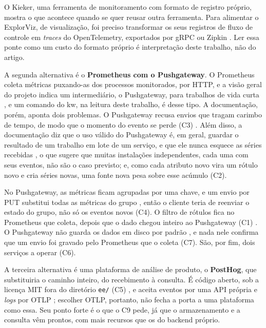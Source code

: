 O Kieker, uma
ferramenta de monitoramento com formato de registro próprio, mostra o que
acontece quando se quer reusar outra ferramenta. Para alimentar o ExplorViz,
de visualização, foi preciso transformar os seus registros de fluxo de
controle em \textit{traces} do OpenTelemetry, exportados por gRPC ou Zipkin
\citep{reichelt2024kieker}. Ler essa ponte como um custo do formato próprio é
interpretação deste trabalho, não do artigo.

A segunda alternativa é o \textbf{Prometheus com o Pushgateway}. O Prometheus
coleta métricas puxando-as dos processos monitorados, por HTTP, e a visão
geral do projeto indica um intermediário, o Pushgateway, para trabalhos de
vida curta \citep{prometheus_overview}, e um comando do kw, na leitura deste
trabalho, é desse tipo. A documentação, porém, aponta dois problemas. O
Pushgateway recusa envios que tragam carimbo de tempo, de modo que o momento
do evento se perde (C3) \citep{pushgateway_readme}. Além disso, a documentação
diz que o uso válido do Pushgateway é, em geral, guardar o resultado de um
trabalho em lote de um serviço, e que ele nunca esquece as séries recebidas
\citep{prometheus_pushing}, o que sugere que muitas instalações independentes,
cada uma com seus eventos, não são o caso previsto; e, como cada atributo novo
vira um rótulo novo e cria séries novas, uma fonte nova pesa sobre esse
acúmulo (C2).

No Pushgateway, as métricas ficam agrupadas por uma chave, e um envio por PUT
substitui todas as métricas do grupo \citep{pushgateway_readme}, então o
cliente teria de reenviar o estado do grupo, não só os eventos novos (C4). O
filtro de rótulos fica no Prometheus que coleta, depois que o dado chegou
inteiro ao Pushgateway (C1) \citep{prometheus_config_v3_16_0}. O Pushgateway
não guarda os dados em disco por padrão \citep{pushgateway_readme}, e nada
nele confirma que um envio foi gravado pelo Prometheus que o coleta (C7). São,
por fim, dois serviços a operar (C6).

A terceira alternativa é uma plataforma de análise de produto, o
\textbf{PostHog}, que substituiria o caminho inteiro, do recebimento à
consulta. É código aberto, sob a licença MIT fora do diretório \texttt{ee/}
(C5) \citep{posthog_license}, e aceita eventos por uma API própria e
\textit{logs} por OTLP \citep{posthog_capture, posthog_logs}; escolher OTLP,
portanto, não fecha a porta a uma plataforma como essa. Seu ponto forte é o
que o C9 pede, já que o armazenamento e a consulta vêm prontos, com mais recursos que
os do backend próprio.

